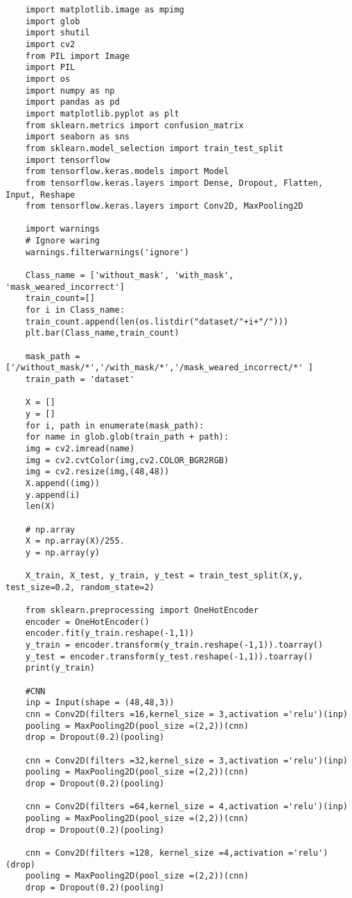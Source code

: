 \begin{lstlisting}
	import matplotlib.image as mpimg
	import glob
	import shutil
	import cv2 
	from PIL import Image
	import PIL
	import os
	import numpy as np
	import pandas as pd
	import matplotlib.pyplot as plt
	from sklearn.metrics import confusion_matrix
	import seaborn as sns
	from sklearn.model_selection import train_test_split
	import tensorflow
	from tensorflow.keras.models import Model
	from tensorflow.keras.layers import Dense, Dropout, Flatten, Input, Reshape
	from tensorflow.keras.layers import Conv2D, MaxPooling2D
	
	import warnings
	# Ignore waring
	warnings.filterwarnings('ignore')
	
	Class_name = ['without_mask', 'with_mask', 'mask_weared_incorrect']
	train_count=[]
	for i in Class_name:
	train_count.append(len(os.listdir("dataset/"+i+"/")))
	plt.bar(Class_name,train_count)
	
	mask_path = ['/without_mask/*','/with_mask/*','/mask_weared_incorrect/*' ]
	train_path = 'dataset'
	
	X = []
	y = []
	for i, path in enumerate(mask_path):
	for name in glob.glob(train_path + path):
	img = cv2.imread(name)
	img = cv2.cvtColor(img,cv2.COLOR_BGR2RGB)
	img = cv2.resize(img,(48,48))
	X.append((img))
	y.append(i)
	len(X)
	
	# np.array
	X = np.array(X)/255.
	y = np.array(y)
	
	X_train, X_test, y_train, y_test = train_test_split(X,y, test_size=0.2, random_state=2)
	
	from sklearn.preprocessing import OneHotEncoder
	encoder = OneHotEncoder()
	encoder.fit(y_train.reshape(-1,1))
	y_train = encoder.transform(y_train.reshape(-1,1)).toarray()
	y_test = encoder.transform(y_test.reshape(-1,1)).toarray()
	print(y_train)
	
	#CNN
	inp = Input(shape = (48,48,3))
	cnn = Conv2D(filters =16,kernel_size = 3,activation ='relu')(inp)
	pooling = MaxPooling2D(pool_size =(2,2))(cnn)
	drop = Dropout(0.2)(pooling)
	
	cnn = Conv2D(filters =32,kernel_size = 3,activation ='relu')(inp)
	pooling = MaxPooling2D(pool_size =(2,2))(cnn)
	drop = Dropout(0.2)(pooling)
	
	cnn = Conv2D(filters =64,kernel_size = 4,activation ='relu')(inp)
	pooling = MaxPooling2D(pool_size =(2,2))(cnn)
	drop = Dropout(0.2)(pooling)
	
	cnn = Conv2D(filters =128, kernel_size =4,activation ='relu')(drop)
	pooling = MaxPooling2D(pool_size =(2,2))(cnn)
	drop = Dropout(0.2)(pooling)
	

\end{lstlisting}
